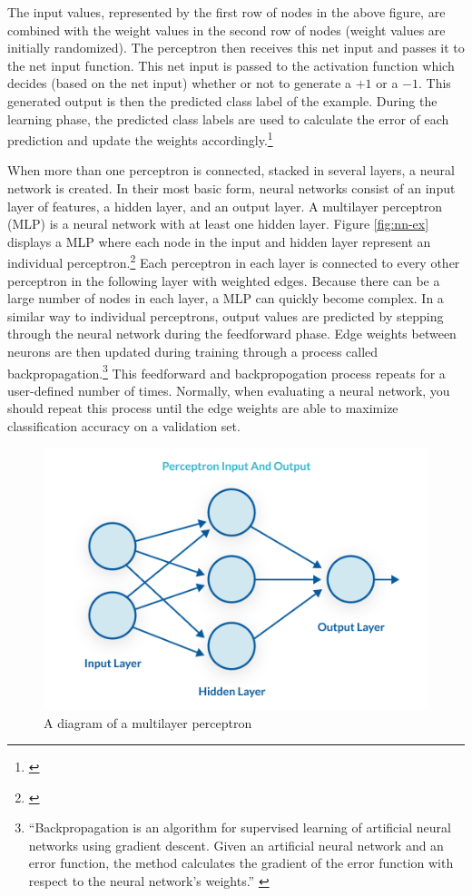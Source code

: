 \documentclass[12pt]{article}
\begin{document}
The input values, represented by the first row of nodes in the above
figure, are combined with the weight values in the second row of nodes
(weight values are initially randomized). The perceptron then receives
this net input and passes it to the net input function. This net input
is passed to the activation function which decides (based on the net
input) whether or not to generate a \(+1\) or a \(-1\). This generated
output is then the predicted class label of the example. During the
learning phase, the predicted class labels are used to calculate the
error of each prediction and update the weights accordingly.\footnote{\citet{reginaoftechNeuralNetworksBasics2019}}

When more than one perceptron is connected, stacked in several layers, a
neural network is created. In their most basic form, neural networks
consist of an input layer of features, a hidden layer, and an output
layer. A multilayer perceptron (MLP) is a neural network with at least
one hidden layer. Figure \ref{fig:nn-ex} displays a MLP where each node
in the input and hidden layer represent an individual
perceptron.\footnote{\citet{PerceptronsMultiLayerPerceptrons}} Each
perceptron in each layer is connected to every other perceptron in the
following layer with weighted edges. Because there can be a large number
of nodes in each layer, a MLP can quickly become complex. In a similar
way to individual perceptrons, output values are predicted by stepping
through the neural network during the feedforward phase. Edge weights
between neurons are then updated during training through a process
called backpropagation.\footnote{``Backpropagation is an algorithm for
  supervised learning of artificial neural networks using gradient
  descent. Given an artificial neural network and an error function, the
  method calculates the gradient of the error function with respect to
  the neural network's weights.'' \citet{Backpropagation}} This
feedforward and backpropogation process repeats for a user-defined
number of times. Normally, when evaluating a neural network, you should
repeat this process until the edge weights are able to maximize
classification accuracy on a validation set.

\begin{figure}[H]

{\centering \includegraphics[width=0.7\linewidth,]{images/neural-network-example} 

}

\caption{\label{fig:nn-ex}A diagram of a multilayer perceptron}\label{fig:unnamed-chunk-5}
\end{figure}
\end{document}
